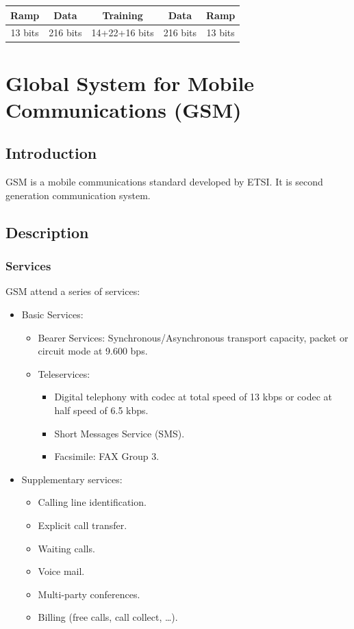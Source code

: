 \documentclass[../main.tex]{subfiles}
\begin{document}
\begin{tabular}{|c|c|c|c|c|}
	\hline
	Ramp	& Data		& Training		& Data		& Ramp \\
	\hline
	13 bits	& 216 bits	& 14+22+16 bits	& 216 bits	& 13 bits \\
	\hline
\end{tabular}

\section{Global System for Mobile Communications (GSM)}

\subsection{Introduction}

GSM is a mobile communications standard developed by ETSI. It is second generation communication system.

\subsection{Description}

\subsubsection{Services}

GSM attend a series of services:

\begin{itemize}
	\item {
		Basic Services:
		\begin{itemize}
			\item Bearer Services: Synchronous/Asynchronous transport capacity, packet or circuit mode at 9.600 bps.
			\item {
				Teleservices:
				\begin{itemize}
					\item Digital telephony with codec at total speed of 13 kbps or codec at half speed of 6.5 kbps.
					\item Short Messages Service (SMS).
					\item Facsimile: FAX Group 3.
				\end{itemize}
			}
		\end{itemize}
	}
	\item {
		Supplementary services:
		\begin{itemize}
			\item Calling line identification.
			\item Explicit call transfer.
			\item Waiting calls.
			\item Voice mail.
			\item Multi-party conferences.
			\item Billing (free calls, call collect, \ldots).
		\end{itemize}
	}
\end{itemize}
\end{document}
